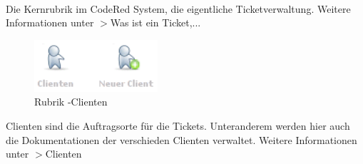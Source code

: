 \\
Die Kernrubrik im CodeRed System, die eigentliche Ticketverwaltung. Weitere Informationen unter $>$Was ist ein Ticket,...
\\
\newpage
\begin{figure}[h]
   \centerline{\includegraphics[width=130pt]{../bilder/clienten-logos.png}}
   \caption{Rubrik -Clienten}
   \label{Rubrik -Clienten}
\end{figure}
Clienten sind die Auftragsorte für die Tickets. Unteranderem werden hier auch die Dokumentationen der verschieden Clienten verwaltet. Weitere Informationen unter $>$Clienten